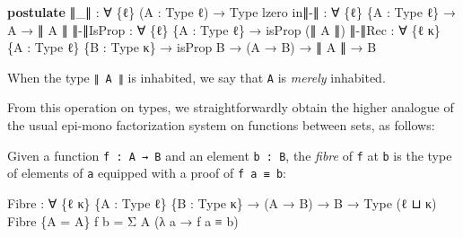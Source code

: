 \documentclass[
  11pt,
  oneside,
  article]{memoir}
\newenvironment{Shaded}{}{}
\newcommand{\KeywordTok}[1]{\textcolor[rgb]{0.00,0.44,0.13}{\textbf{#1}}}
\newcommand{\NormalTok}[1]{#1}
\newcommand{\OtherTok}[1]{\textcolor[rgb]{0.00,0.44,0.13}{#1}}
\theoremstyle{definition}
\theoremstyle{plain}
\newcommand{\0}{\textsf{0}}
\newcommand{\1}{\tn{\textsf{1}}}
\begin{document}
\begin{Shaded}
\begin{Highlighting}[]
\KeywordTok{postulate}
\NormalTok{    ∥}\OtherTok{\_}\NormalTok{∥ }\OtherTok{:} \OtherTok{∀} \OtherTok{\{}\NormalTok{ℓ}\OtherTok{\}} \OtherTok{(}\NormalTok{A }\OtherTok{:}\NormalTok{ Type ℓ}\OtherTok{)} \OtherTok{→}\NormalTok{ Type lzero}
\NormalTok{    in∥{-}∥ }\OtherTok{:} \OtherTok{∀} \OtherTok{\{}\NormalTok{ℓ}\OtherTok{\}} \OtherTok{\{}\NormalTok{A }\OtherTok{:}\NormalTok{ Type ℓ}\OtherTok{\}} \OtherTok{→}\NormalTok{ A }\OtherTok{→}\NormalTok{ ∥ A ∥}
\NormalTok{    ∥{-}∥IsProp }\OtherTok{:} \OtherTok{∀} \OtherTok{\{}\NormalTok{ℓ}\OtherTok{\}} \OtherTok{\{}\NormalTok{A }\OtherTok{:}\NormalTok{ Type ℓ}\OtherTok{\}} \OtherTok{→}\NormalTok{ isProp }\OtherTok{(}\NormalTok{∥ A ∥}\OtherTok{)}
\NormalTok{    ∥{-}∥Rec }\OtherTok{:} \OtherTok{∀} \OtherTok{\{}\NormalTok{ℓ κ}\OtherTok{\}} \OtherTok{\{}\NormalTok{A }\OtherTok{:}\NormalTok{ Type ℓ}\OtherTok{\}} \OtherTok{\{}\NormalTok{B }\OtherTok{:}\NormalTok{ Type κ}\OtherTok{\}}
            \OtherTok{→}\NormalTok{ isProp B }\OtherTok{→} \OtherTok{(}\NormalTok{A }\OtherTok{→}\NormalTok{ B}\OtherTok{)} \OtherTok{→}\NormalTok{ ∥ A ∥ }\OtherTok{→}\NormalTok{ B}
\end{Highlighting}
\end{Shaded}

When the type \texttt{∥\ A\ ∥} is inhabited, we say that \texttt{A} is
\emph{merely} inhabited.

From this operation on types, we straightforwardly obtain the higher
analogue of the usual epi-mono factorization system on functions between
sets, as follows:

Given a function \texttt{f\ :\ A\ →\ B} and an element \texttt{b\ :\ B},
the \emph{fibre} of \texttt{f} at \texttt{b} is the type of elements of
\texttt{a} equipped with a proof of \texttt{f\ a\ ≡\ b}:

\begin{Shaded}
\begin{Highlighting}[]
\NormalTok{Fibre }\OtherTok{:} \OtherTok{∀} \OtherTok{\{}\NormalTok{ℓ κ}\OtherTok{\}} \OtherTok{\{}\NormalTok{A }\OtherTok{:}\NormalTok{ Type ℓ}\OtherTok{\}} \OtherTok{\{}\NormalTok{B }\OtherTok{:}\NormalTok{ Type κ}\OtherTok{\}} \OtherTok{→} \OtherTok{(}\NormalTok{A }\OtherTok{→}\NormalTok{ B}\OtherTok{)} \OtherTok{→}\NormalTok{ B }\OtherTok{→}\NormalTok{ Type }\OtherTok{(}\NormalTok{ℓ ⊔ κ}\OtherTok{)}
\NormalTok{Fibre }\OtherTok{\{}\NormalTok{A }\OtherTok{=}\NormalTok{ A}\OtherTok{\}}\NormalTok{ f b }\OtherTok{=}\NormalTok{ Σ A }\OtherTok{(λ}\NormalTok{ a }\OtherTok{→}\NormalTok{ f a ≡ b}\OtherTok{)}
\end{Highlighting}
\end{Shaded}
\end{document}
